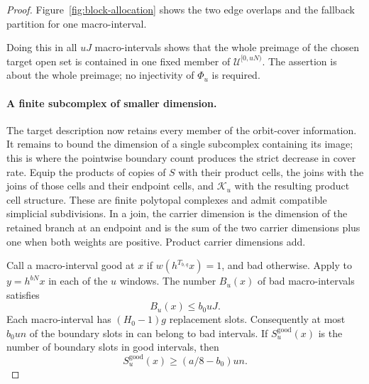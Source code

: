 \begin{proof}
Figure~\ref{fig:block-allocation} shows the two edge overlaps and the
fallback partition for one macro-interval.


Doing this in all $uJ$ macro-intervals shows that the whole
preimage of the chosen target open set is contained in one
fixed member of $\mathcal U^{[0,uN)}$.  The assertion is about
the whole preimage; no injectivity of $\Phi_u$ is required.

\paragraph{A finite subcomplex of smaller dimension.}
The target description now retains every member of the orbit-cover
information. It remains to bound the dimension of a single subcomplex
containing its image; this is where the pointwise boundary count produces
the strict decrease in cover rate.
Equip the products of copies of $S$ with their product cells,
the joins with the joins of those cells and their endpoint
cells, and $\mathcal K_u$ with the resulting product cell
structure.  These are finite polytopal complexes and admit
compatible simplicial subdivisions.  In a join, the carrier
dimension is the dimension of the retained branch at an
endpoint and is the sum of the two carrier dimensions plus
one when both weights are positive.  Product carrier
dimensions add.

Call a macro-interval good at $x$ if $w(h^{T_{b,q}}x)=1$,
and bad otherwise.  Apply 
to $y=h^{bN}x$ in each of the $u$ windows.  The number
$B_u(x)$ of bad macro-intervals satisfies
\begin{equation}
\label{eq:cover-bad-count}
 B_u(x)\le b_0uJ.
\end{equation}
Each macro-interval has $(H_0-1)g$ replacement slots.
Consequently at most $b_0un$ of the boundary slots in
 can belong to bad intervals.
If $S_u^{\mathrm{good}}(x)$ is the number of boundary slots
in good intervals, then
\begin{equation}
\label{eq:cover-good-successes}
 S_u^{\mathrm{good}}(x)\ge(a/8-b_0)un.
\end{equation}


\end{proof}
